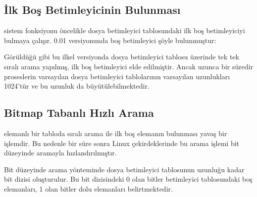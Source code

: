 \documentclass[a4paper,10pt,turkish]{sphinxmanual}
\begin{document}
\subsection{İlk Boş Betimleyicinin Bulunması}
\label{\detokenize{filesystem1:ilk-bos-betimleyicinin-bulunmasi}}
\sphinxAtStartPar
{} sistem fonksiyonu öncelikle dosya betimleyici tablosundaki ilk boş betimleyiciyi
bulmaya çalışır. 0.01 versiyonunda boş betimleyici şöyle bulunmuştur:

\begin{sphinxVerbatim}[commandchars=\\\{\}]

\PYG{p}{[}\PYG{p}{]}

\end{sphinxVerbatim}

\sphinxAtStartPar
Görüldüğü gibi bu ilkel versiyonda dosya betimleyici tablosu üzerinde tek tek sıralı arama
yapılmış, ilk boş betimleyici elde edilmiştir. Ancak uzunca bir süredir proseslerin varsayılan
dosya betimleyici tablolarının varsayılan uzunlukları 1024’tür ve bu uzunluk da büyütülebilmektedir.


\subsection{Bitmap Tabanlı Hızlı Arama}
\label{\detokenize{filesystem1:bitmap-tabanli-hizli-arama}}
 elemanlı bir tabloda sıralı arama ile ilk boş elemanın bulunması yavaş bir işlemdir. Bu
nedenle bir süre sonra Linux çekirdeklerinde bu arama işlemi bit düzeyinde aramayla
hızlandırılmıştır.

\sphinxAtStartPar
Bit düzeyinde arama yönteminde dosya betimleyici tablosunun uzunluğu kadar bit dizisi
oluşturulur. Bu bit dizisindeki 0 olan bitler betimleyici tablosundaki boş elemanları, 1 olan
bitler dolu elemanları belirtmektedir.
\end{document}
